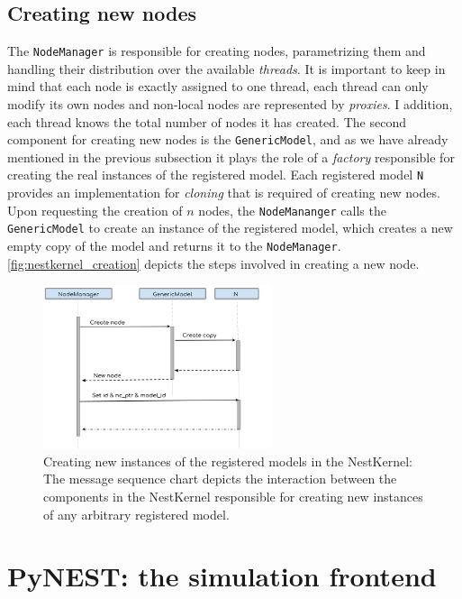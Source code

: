 \subsection{Creating new nodes}

The \texttt{NodeManager} is responsible for creating nodes, parametrizing them and handling their distribution over the available \emph{threads}. It is important to keep in mind that each node is exactly assigned to one thread, each thread can only modify its own nodes and non-local nodes are represented by \emph{proxies}. I addition, each thread knows the total number of nodes it has created. The second component for creating new nodes is the \texttt{GenericModel}, and as we have already mentioned in the previous subsection it plays the role of a \emph{factory} responsible for creating the real instances of the registered model. Each registered model \texttt{N} provides an implementation for \emph{cloning} that is required of creating new nodes. Upon requesting the creation of $n$ nodes, the \texttt{NodeMananger} calls the \texttt{GenericModel} to create an instance of the registered model, which creates a new empty copy of the model and returns it to the \texttt{NodeManager}. \autoref{fig:nestkernel_creation} depicts the steps involved in creating a new node.

\begin{figure}[ht!]
\centering
\includegraphics[width=0.6\textwidth]{src/pic/nodes_creation.png}
\caption{Creating new instances of the registered models in the NestKernel: The message sequence chart depicts the interaction between the components in the NestKernel responsible for creating new instances of any arbitrary registered model.}
\label{fig:nestkernel_creation}
\end{figure}

\section{PyNEST: the simulation frontend}

